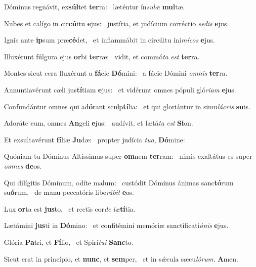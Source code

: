 \item Dóminus regnávit, ex\textbf{súl}tet \textbf{ter}ra:~\psstar{} læténtur ín\textit{sulæ} \textbf{mul}tæ.
\item Nubes et calígo in cir\textbf{cú}itu \textbf{e}jus:~\psstar{} justítia, et judícium corréctio \textit{sedis} \textbf{e}jus.
\item Ignis ante \textbf{ip}sum præ\textbf{cé}det,~\psstar{} et inflammábit in circúitu ini\textit{mícos} \textbf{e}jus.
\item Illuxérunt fúlgura ejus \textbf{or}bi \textbf{ter}ræ:~\psstar{} vidit, et commó\textit{ta} \textit{est} \textbf{ter}ra.
\item Montes sicut cera fluxérunt a \textbf{fá}cie \textbf{Dó}mini:~\psstar{} a fácie Dómini \textit{omnis} \textbf{ter}ra.
\item Annuntiavérunt cæli jus\textbf{tí}tiam \textbf{e}jus:~\psstar{} et vidérunt omnes pópuli gló\textit{riam} \textbf{e}jus.
\item Confundántur omnes qui ad\textbf{ó}rant sculp\textbf{tí}lia:~\psstar{} et qui gloriántur in simu\textit{lácris} \textbf{su}is.
\item Adoráte eum, omnes \textbf{An}geli \textbf{e}jus:~\psstar{} audívit, et lætá\textit{ta} \textit{est} \textbf{Si}on.
\item Et exsultavérunt \textbf{fí}liæ \textbf{Ju}dæ:~\psstar{} propter judícia \textit{tua}, \textbf{Dó}mine:
\item Quóniam tu Dóminus Altíssimus super \textbf{om}nem \textbf{ter}ram:~\psstar{} nimis exaltátus es super \textit{omnes} \textbf{de}os.
\item Qui dilígitis Dóminum, odíte malum:~\pscross{} custódit Dóminus ánimas sanc\textbf{tó}rum su\textbf{ó}rum,~\psstar{} de manu peccatóris libe\textit{rábit} \textbf{e}os.
\item Lux \textbf{or}ta est \textbf{jus}to,~\psstar{} et rectis cor\textit{de} \textit{læ}\textbf{tí}tia.
\item Lætámini \textbf{jus}ti in \textbf{Dó}mino:~\psstar{} et confitémini memóriæ sanctificati\textit{ónis} \textbf{e}jus.
\item Glória \textbf{Pa}tri, et \textbf{Fí}lio,~\psstar{} et Spirí\textit{tui} \textbf{Sanc}to.
\item Sicut erat in princípio, et \textbf{nunc}, et \textbf{sem}per,~\psstar{} et in sǽcula sæcu\textit{lórum}. \textbf{A}men.
